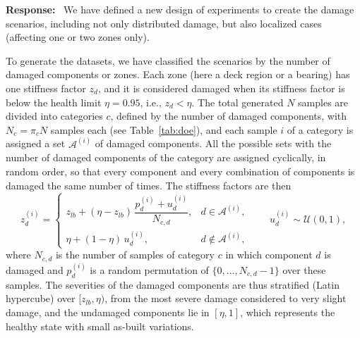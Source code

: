 \documentclass[11pt]{article}
\newenvironment{response}{\par\smallskip\noindent\color{resp}\textbf{Response:}\ }{\par}
\begin{document}
\begin{response}
We have defined a new design of experiments to create the damage scenarios, including not only distributed damage, but also localized cases (affecting one or two zones only). 

To generate the datasets, we have classified the scenarios by the number of damaged components or zones. 
Each zone (here a deck region or a bearing) has one stiffness factor $z_d$, and it is considered damaged when its stiffness factor is below the health limit $\eta=0.95$, i.e., $z_d<\eta$. 
The total generated $N$ samples are divided into categories $c$, defined by the number of damaged components, with $N_c=\pi_c N$ samples each (see Table~\ref{tab:doe}), and each sample $i$ of a category is assigned a set $\mathcal{A}^{(i)}$ of damaged components. 
All the possible sets with the number of damaged components of the category are assigned cyclically, in random order, so that every component and every combination of components is damaged the same number of times. 
The stiffness factors are then
\begin{equation}
z_d^{(i)}=
\begin{cases}
z_{lb}+(\eta-z_{lb})\,\dfrac{p_d^{(i)}+u_d^{(i)}}{N_{c,d}}, & d\in\mathcal{A}^{(i)},\\[2ex]
\eta+(1-\eta)\,u_d^{(i)}, & d\notin\mathcal{A}^{(i)},
\end{cases}
\qquad u_d^{(i)}\sim\mathcal{U}(0,1),
\label{eq:doe}
\end{equation}
where $N_{c,d}$ is the number of samples of category $c$ in which component $d$ is damaged and $p_d^{(i)}$ is a random
permutation of $\{0,\dots,N_{c,d}-1\}$ over these samples. The severities of the damaged components are thus stratified
(Latin hypercube) over $[z_{lb},\eta)$, from the most severe damage considered to very slight damage, and the
undamaged components lie in $[\eta,1]$, which represents the healthy state with small as-built variations.


\end{response}
\end{document}
